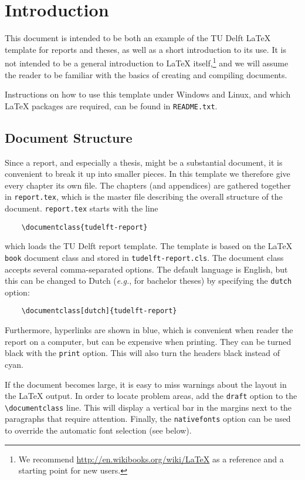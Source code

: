 \chapter{Introduction}

This document is intended to be both an example of the TU Delft \LaTeX{} template for reports and theses, as well as a short introduction to its use. It is not intended to be a general introduction to \LaTeX{} itself,\footnote{We recommend \url{http://en.wikibooks.org/wiki/LaTeX} as a reference and a starting point for new users.} and we will assume the reader to be familiar with the basics of creating and compiling documents.

Instructions on how to use this template under Windows and Linux, and which \LaTeX{} packages are required, can be found in \texttt{README.txt}.

\section{Document Structure}

Since a report, and especially a thesis, might be a substantial document, it is convenient to break it up into smaller pieces. In this template we therefore give every chapter its own file. The chapters (and appendices) are gathered together in \texttt{report.tex}, which is the master file describing the overall structure of the document. \texttt{report.tex} starts with the line
\begin{verbatim}
    \documentclass{tudelft-report}
\end{verbatim}
which loads the TU Delft report template. The template is based on the \LaTeX{} \texttt{book} document class and stored in \texttt{tudelft-report.cls}. The document class accepts several comma-separated options. The default language is English, but this can be changed to Dutch (\emph{e.g.}, for bachelor theses) by specifying the \texttt{dutch} option:
\begin{verbatim}
    \documentclass[dutch]{tudelft-report}
\end{verbatim}
Furthermore, hyperlinks are shown in blue, which is convenient when reader the report on a computer, but can be expensive when printing. They can be turned black with the \texttt{print} option. This will also turn the headers black instead of cyan.

If the document becomes large, it is easy to miss warnings about the layout in the \LaTeX{} output. In order to locate problem areas, add the \texttt{draft} option to the \verb|\documentclass| line. This will display a vertical bar in the margins next to the paragraphs that require attention. Finally, the \texttt{nativefonts} option can be used to override the automatic font selection (see below).

